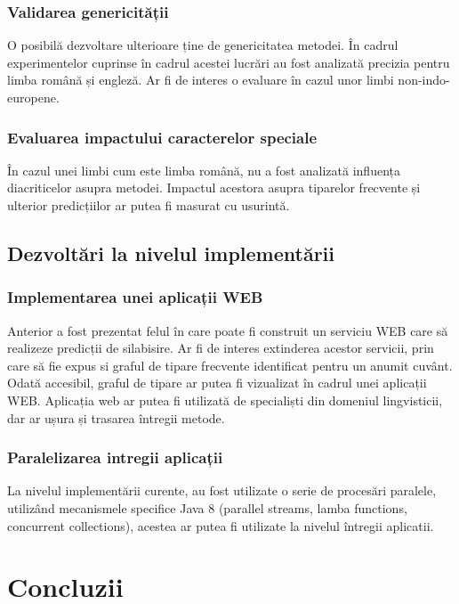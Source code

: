 \subsection{Validarea genericității} 

O posibilă dezvoltare ulterioare ține de genericitatea metodei. În cadrul experimentelor cuprinse în cadrul acestei lucrări au fost analizată precizia pentru limba română și engleză. Ar fi de interes o evaluare în cazul unor limbi non-indo-europene.

\subsection{Evaluarea impactului caracterelor speciale} 

În cazul unei limbi cum este limba română, nu a fost analizată influența diacriticelor asupra metodei. Impactul acestora asupra tiparelor frecvente și ulterior predicțiilor ar putea fi masurat cu usurintă. 

\section{Dezvoltări la nivelul implementării}

\subsection{Implementarea unei aplicații WEB}

Anterior a fost prezentat felul în care poate fi construit un serviciu WEB care să realizeze predicții de silabisire. Ar fi de interes extinderea acestor servicii, prin care să fie expus si graful de tipare frecvente identificat pentru un anumit cuvânt. Odată accesibil, graful de tipare ar putea fi vizualizat în cadrul unei aplicații WEB. Aplicația web ar putea fi utilizată de specialiști din domeniul lingvisticii, dar ar ușura și trasarea întregii metode.

\subsection{Paralelizarea intregii aplicații}

La nivelul implementării curente, au fost utilizate o serie de procesări paralele, utilizând mecanismele specifice Java 8 (parallel streams, lamba functions, concurrent collections), acestea ar putea fi utilizate la nivelul întregii aplicatii. 


\chapter{Concluzii}
\label{cap:concluzii}

